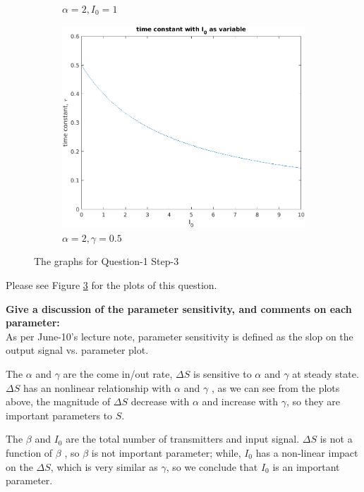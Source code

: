 \begin{figure}[h]
\begin{subfigure}[b]{0.3\textwidth}
         \caption{$\alpha = 2, I_0 = 1$}
         \label{fig:three sin x}
     \end{subfigure}
     \begin{subfigure}[b]{0.3\textwidth}
         \centering
         \includegraphics[width=\textwidth]{picture/Figure_1-3I0.png}
         \caption{$\alpha = 2, \gamma = 0.5$}
         \label{fig:five over x}
     \end{subfigure}
        \caption{The graphs for Question-1 Step-3}
        \label{fig:fourgraphsforq3}
\end{figure}
Please see Figure \ref{fig:fourgraphsforq3} for the plots of this question.


\textbf{Give a discussion of the parameter sensitivity, and comments on each parameter:}
\\As per June-10's lecture note, parameter sensitivity is defined as the slop on the output signal vs. parameter plot. 

The $\alpha$ and $\gamma$ are the come in/out rate, $\Delta S$ is sensitive to  $\alpha$ and $\gamma$ at steady state. $\Delta S$ has an nonlinear relationship with $\alpha$ and $\gamma$ , as we can see from the plots above, the magnitude of $\Delta S$ decrease with $\alpha$ and increase with $\gamma$, so they are important parameters to $S$. 

The $\beta$ and $I_0$ are the total number of transmitters and input signal.  $\Delta S$ is not a function of $\beta$ , so $\beta$ is not important parameter; while, $I_0$ has a non-linear impact on the $\Delta S$, which is very similar as $\gamma$, so we conclude that $I_0$ is an important parameter.

